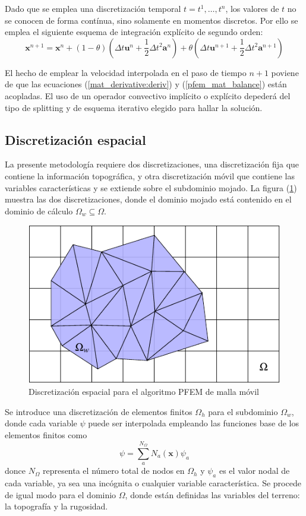 Dado que se emplea una discretización temporal $t=t^1, \dots, t^n$, los valores de $t$ no se conocen de forma contínua, sino solamente en momentos discretos. Por ello se emplea el siguiente esquema de integración explícito de segundo orden:
\begin{equation}
    \mathbf{x}^{n+1} = \mathbf{x}^n +
        (1-\theta) (\Delta t \mathbf{u}^n + \frac{1}{2} \Delta t^2 \mathbf{a}^n) +
        \theta (\Delta t \mathbf{u}^{n+1} + \frac{1}{2} \Delta t^2 \mathbf{a}^{n+1})
\end{equation}

El hecho de emplear la velocidad interpolada en el paso de tiempo $n+1$ poviene de que las ecuaciones (\ref{mat_derivative:deriv}) y (\ref{pfem_mat_balance}) están acopladas. El uso de un operador convectivo implícito o explícito depederá del tipo de splitting y de esquema iterativo elegido para hallar la solución.


\subsection{Discretización espacial}

La presente metodología requiere dos discretizaciones, una discretización fija que contiene la información topográfica, y otra discretización móvil que contiene las variables características y se extiende sobre el subdominio mojado. La figura (\ref{pfem_dual_mesh}) muestra las dos discretizaciones, donde el dominio mojado está contenido en el dominio de cálculo $\Omega_w \subseteq \Omega$.

\begin{figure}
    \centering
    \includegraphics[width=.6\textwidth]{img/lagrangian/dual_pfem_mesh.pdf}
    \caption{Discretización espacial para el algoritmo PFEM de malla móvil}
    \label{pfem_dual_mesh}
\end{figure}

Se introduce una discretización de elementos finitos $\Omega_h$ para el subdominio $\Omega_w$, donde cada variable $\psi$ puede ser interpolada empleando las funciones base de los elementos finitos como
\begin{equation}
    \psi = \sum_a^{N_\Omega} N_a(\mathbf{x}) \psi_{a}
\end{equation}
donce $N_\Omega$ representa el número total de nodos en $\Omega_h$ y $\psi_a$ es el valor nodal de cada variable, ya sea una incógnita o cualquier variable característica. Se procede de igual modo para el dominio $\Omega$, donde están definidas las variables del terreno: la topografía y la rugosidad.


